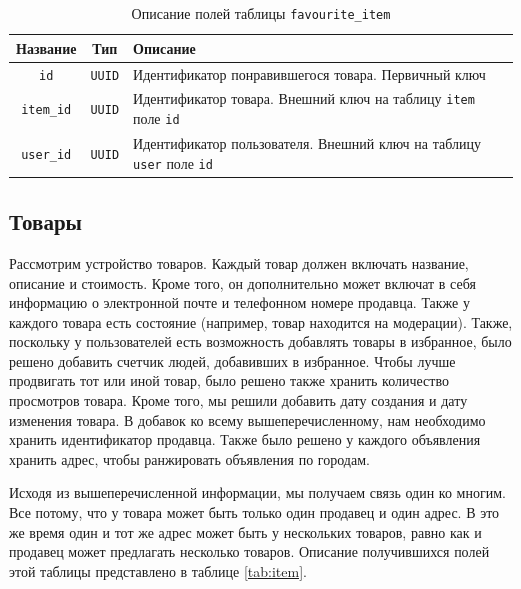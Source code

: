 \documentclass[a4paper,14pt]{extarticle}
\begin{document}
\begin{center}
    \begin{longtable}{|c|c|>{\centering\arraybackslash}m{11.9cm}|}
        \caption{Описание полей таблицы \texttt{favourite\_item}}
        \label{tab:favourite_item}
        \\
        \hline
        \textbf{Название} & \textbf{Тип}  & \textbf{Описание}                                                                  \\
        \hline
        \texttt{id}       & \texttt{UUID} & Идентификатор понравившегося товара. Первичный ключ                                \\
        \hline
        \texttt{item\_id} & \texttt{UUID} & Идентификатор товара. Внешний ключ на таблицу \texttt{item} поле \texttt{id}       \\
        \hline
        \texttt{user\_id} & \texttt{UUID} & Идентификатор пользователя. Внешний ключ на таблицу \texttt{user} поле \texttt{id} \\
        \hline
    \end{longtable}
\end{center}

\subsection{Товары}

Рассмотрим устройство товаров. Каждый товар должен включать название, описание и стоимость. Кроме того, он дополнительно может включат в себя информацию о электронной почте и телефонном номере продавца. Также у каждого товара есть состояние (например, товар находится на модерации). Также, поскольку у пользователей есть возможность добавлять товары в избранное, было решено добавить счетчик людей, добавивших в избранное. Чтобы лучше продвигать тот или иной товар, было решено также хранить количество просмотров товара. Кроме того, мы решили добавить дату создания и дату изменения товара. В добавок ко всему вышеперечисленному, нам необходимо хранить идентификатор продавца. Также было решено у каждого объявления хранить адрес, чтобы ранжировать объявления по городам.

Исходя из вышеперечисленной информации, мы получаем связь один ко многим. Все потому, что у товара может быть только один продавец и один адрес. В это же время один и тот же адрес может быть у нескольких товаров, равно как и продавец может предлагать несколько товаров. Описание получившихся полей этой таблицы представлено в таблице \ref{tab:item}.
\end{document}
